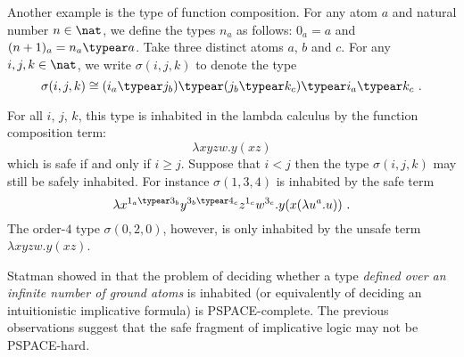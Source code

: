Another example is the type of function composition. For any atom
$a$ and natural number $n\in\nat$, we define the types $n_a$ as
follows: $0_a = a$ and $(n+1)_a = n_a \typear a$. Take three
distinct atoms $a$, $b$ and $c$. For any $i,j,k\in\nat$, we write
$\sigma(i,j,k)$ to denote the type
$$\sigma(i,j,k) \cong (i_a \typear j_b) \typear (j_b \typear k_c) \typear i_a \typear
k_c \ .$$

For all $i$, $j$, $k$, this type is inhabited in the lambda calculus by the function composition term:
$$\lambda x y z w . y (x z) $$
which is safe if and only if $i\geq j$. Suppose that $i<j$ then the type
$\sigma(i,j,k)$ may still be safely inhabited. For instance
$\sigma(1,3,4)$ is inhabited by the safe term
$$ \lambda x^{1_a \typear 3_b} y^{3_b \typear 4_c} z^{1_c} w^{3_c} . y (x (\lambda u^a . u)) \ .$$
The order-$4$ type $\sigma(0,2,0)$, however, is only inhabited by the unsafe term $\lambda x y z w. y (x z) $.


Statman showed in \cite{Statman1979} that the problem of deciding
whether a type \emph{defined over an infinite number of ground
atoms} is inhabited (or equivalently of deciding an intuitionistic
implicative formula) is PSPACE-complete. The previous observations suggest that the safe
fragment of implicative logic may not be PSPACE-hard.
